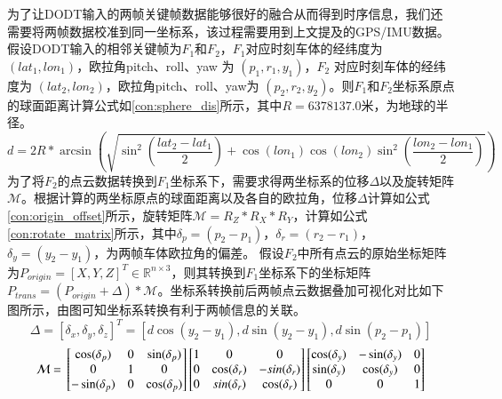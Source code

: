 为了让DODT输入的两帧关键帧数据能够很好的融合从而得到时序信息，我们还需要将两帧数据校准到同一坐标系，该过程需要用到上文提及的GPS/IMU数据。假设DODT输入的相邻关键帧为$F_1$和$F_2$，$F_1$对应时刻车体的经纬度为 $(lat_1, lon_1)$，欧拉角pitch、roll、yaw 为 $(p_1,r_1,y_1)$，$F_2$ 对应时刻车体的经纬度为 $(lat_2, lon_2)$，欧拉角pitch、roll、yaw为 $(p_2,r_2,y_2)$。则$F_1$和$F_2$坐标系原点的球面距离计算公式如\ref{con:sphere_dis}所示，其中$R=6378137.0$米，为地球的半径。
\begin{equation}
d = 2R * \arcsin(\sqrt{\sin^2(\frac{lat_2 - lat_1}{2}) + \cos(lon_1)\cos(lon_2)\sin^2(\frac{lon_2 - lon_1}{2})})
\label{con:sphere_dis}
\end{equation}
为了将$F_2$的点云数据转换到$F_1$坐标系下，需要求得两坐标系的位移$\Delta$以及旋转矩阵$\mathcal{M}$。根据计算的两坐标原点的球面距离以及各自的欧拉角，位移$\Delta$计算如公式\ref{con:origin_offset}所示，旋转矩阵$\mathcal{M} = R_Z * R_X * R_Y$，计算如公式\ref{con:rotate_matrix}所示，其中$\delta_p = (p_2 - p_1)$，$\delta_r = (r_2 - r_1)$，$\delta_y = (y_2 - y_1)$，为两帧车体欧拉角的偏差。 假设$F_2$中所有点云的原始坐标矩阵为$P_{origin} = [X,Y,Z]^T \in \mathbb{R}^{ n \times 3}$，则其转换到$F_1$坐标系下的坐标矩阵$P_{trans} = (P_{origin} + \Delta) * \mathcal{M}$。坐标系转换前后两帧点云数据叠加可视化对比如下图所示，由图可知坐标系转换有利于两帧信息的关联。 
\begin{equation}
\Delta = [\delta_x, \delta_y, \delta_z]^T = [d\cos(y_2-y_1), d\sin(y_2-y_1),d\sin(p_2-p_1)]
\label{con:origin_offset}
\end{equation}
\begin{equation}
\mathcal{M} = \\
	\begin{bmatrix} 
		\cos(\delta_p) & 0 & \sin(\delta_p)\\
		0 & 1 & 0 \\
		-\sin(\delta_p) & 0 & \cos(\delta_p)
	\end{bmatrix}
	\begin{bmatrix} 
	1 & 0 & 0\\
	0 & \cos(\delta_r) & -sin(\delta_r) \\
	0 & sin(\delta_r) & \cos(\delta_r)
	\end{bmatrix}
	\begin{bmatrix} 
	\cos(\delta_y) & -\sin(\delta_y) & 0\\
	\sin(\delta_y) & \cos(\delta_y) & 0 \\
	0 & 0 & 1
	\end{bmatrix}
\label{con:rotate_matrix}
\end{equation}

